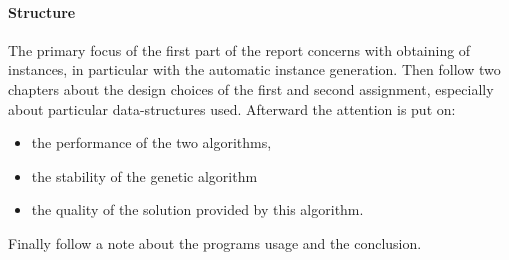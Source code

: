 \paragraph{Structure} The primary focus
of the first part of the report concerns with obtaining of instances, in particular with the automatic instance
generation. Then follow two chapters about the design choices of the first and second assignment, especially about
particular data-structures used. Afterward the attention is put on:
\begin{itemize}
	\item the performance of the two algorithms,
	\item the stability of the genetic algorithm 
	\item the quality of the solution provided by this algorithm.
\end{itemize}
Finally follow a note about the programs usage and the conclusion.
 

